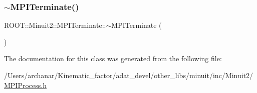 \subsubsection{\texorpdfstring{$\sim$MPITerminate()}{~MPITerminate()}\hspace{0.1cm}{\footnotesize\ttfamily [2/2]}}
{\footnotesize\ttfamily R\+O\+O\+T\+::\+Minuit2\+::\+M\+P\+I\+Terminate\+::$\sim$\+M\+P\+I\+Terminate (\begin{DoxyParamCaption}{ }\end{DoxyParamCaption})\hspace{0.3cm}{\ttfamily [inline]}}



The documentation for this class was generated from the following file\+:\begin{DoxyCompactItemize}
\item 
/\+Users/archanar/\+Kinematic\+\_\+factor/adat\+\_\+devel/other\+\_\+libs/minuit/inc/\+Minuit2/\mbox{\hyperlink{other__libs_2minuit_2inc_2Minuit2_2MPIProcess_8h}{M\+P\+I\+Process.\+h}}\end{DoxyCompactItemize}
